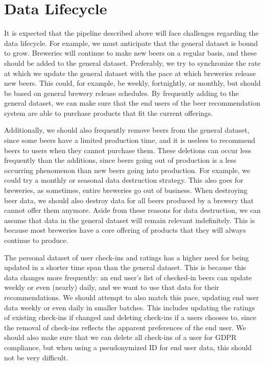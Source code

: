 \documentclass[sigconf, natbib=true]{acmart}
\begin{document}
\section{Data Lifecycle}
It is expected that the pipeline described above will face challenges regarding the data lifecycle.
For example, we must anticipate that the general dataset is bound to grow.
Breweries will continue to make new beers on a regular basis, and these should be added to the general dataset.
Preferably, we try to synchronize the rate at which we update the general dataset with the pace at which breweries release new beers.
This could, for example, be weekly, fortnightly, or monthly, but should be based on general brewery release schedules.
By frequently adding to the general dataset, we can make sure that the end users of the beer recommendation system are able to purchase products that fit the current offerings.

Additionally, we should also frequently remove beers from the general dataset, since some beers have a limited production time, and it is useless to recommend beers to users when they cannot purchase them.
These deletions can occur less frequently than the additions, since beers going out of production is a less occurring phenomenon than new beers going into production.
For example, we could try a monthly or seasonal data destruction strategy.
This also goes for breweries, as sometimes, entire breweries go out of business.
When destroying beer data, we should also destroy data for all beers produced by a brewery that cannot offer them anymore.
Aside from these reasons for data destruction, we can assume that data in the general dataset will remain relevant indefinitely.
This is because most breweries have a core offering of products that they will always continue to produce.

The personal dataset of user check-ins and ratings has a higher need for being updated in a shorter time span than the general dataset.
This is because this data changes more frequently: an end user's list of checked-in beers can update weekly or even (nearly) daily, and we want to use that data for their recommendations.
We should attempt to also match this pace, updating end user data weekly or even daily in smaller batches.
This includes updating the ratings of existing check-ins if changed and deleting check-ins if a users chooses to, since the removal of check-ins reflects the apparent preferences of the end user.
We should also make sure that we can delete all check-ins of a user for GDPR compliance, but when using a pseudonymized ID for end user data, this should not be very difficult.
\end{document}
